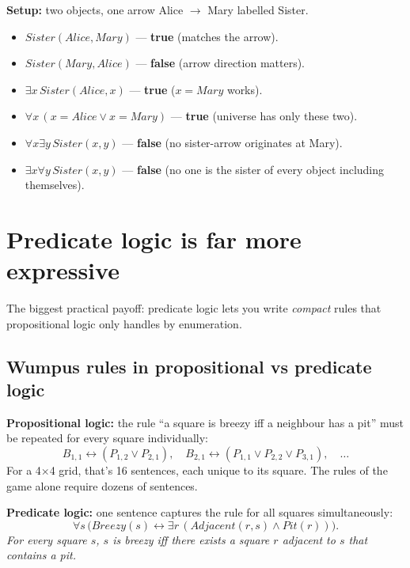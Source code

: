 \documentclass[11pt, a4paper]{article}
\begin{document}
\begin{exbox}
\textbf{Setup:} two objects, one arrow Alice $\to$ Mary labelled Sister.\\[0.3em]
\begin{itemize}[leftmargin=*, itemsep=0pt, topsep=0pt]
  \item $Sister(Alice, Mary)$ — \textbf{true} (matches the arrow).
  \item $Sister(Mary, Alice)$ — \textbf{false} (arrow direction matters).
  \item $\exists x \, Sister(Alice, x)$ — \textbf{true} ($x = Mary$ works).
  \item $\forall x \, (x = Alice \lor x = Mary)$ — \textbf{true} (universe has only these two).
  \item $\forall x \exists y \, Sister(x, y)$ — \textbf{false} (no sister-arrow originates at Mary).
  \item $\exists x \forall y \, Sister(x, y)$ — \textbf{false} (no one is the sister of every object including themselves).
\end{itemize}
\end{exbox}

\section{Predicate logic is far more expressive}

The biggest practical payoff: predicate logic lets you write \emph{compact} rules that propositional logic only handles by enumeration.

\subsection{Wumpus rules in propositional vs predicate logic}

\textbf{Propositional logic:} the rule ``a square is breezy iff a neighbour has a pit'' must be repeated for every square individually:
\[
B_{1,1} \leftrightarrow (P_{1,2} \lor P_{2,1}), \quad B_{2,1} \leftrightarrow (P_{1,1} \lor P_{2,2} \lor P_{3,1}), \quad \dots
\]
For a 4$\times$4 grid, that's 16 sentences, each unique to its square. The rules of the game alone require dozens of sentences.

\textbf{Predicate logic:} one sentence captures the rule for all squares simultaneously:
\[
\forall s \, \bigl(Breezy(s) \leftrightarrow \exists r \, (Adjacent(r, s) \land Pit(r))\bigr).
\]
\textit{For every square $s$, $s$ is breezy iff there exists a square $r$ adjacent to $s$ that contains a pit.}
\end{document}
